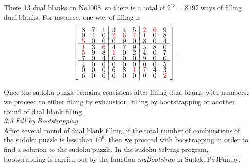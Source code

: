 \documentclass{article}[12pt,a4paper]
\begin{document}
There 13 dual blanks on No1008, so there is a total of $2^{13} = 8192$ ways of filling dual blanks. For instance, one way of filling is\\
\[ \left [ \begin{array}{ccc|ccc|ccc}
8 & 7 & 1 & 3 & 4 & 5 & \color{red} 2 & \color{red} 6 & 9 \\[-0.05in]
0 & 4 & 0 & \color{red} 2 & \color{red} 6 & \color{red} 7 & 1 & 0 & 8 \\[-0.05in]
\color{red} 5 & 0 & 0 & 0 & 9 & 0 & 3 & 0 & 4 \\[-0.05in] \hline
\color{red} 1 & 3 & \color{red} 6 & 4 & 7 & 9 & 5 & 8 & 0 \\[-0.05in]
\color{red} 5 & 9 & 8 & \color{red} 1 & 0 & 2 & 4 & 0 & 7 \\[-0.05in]
7 & 0 & 4 & 0 & 0 & 0 & 9 & 0 & 0 \\[-0.05in] \hline
4 & 0 & 0 & 0 & 0 & 0 & 0 & 0 & 5 \\[-0.05in]
0 & 0 & 0 & 6 & 8 & \color{red} 1 & \color{red} 7 & 4 & 3 \\[-0.05in]
6 & 0 & 0 & 0 & 0 & 0 & 0 & 0 & \color{red} 2 
\end{array} \right] \, .\]
\vspace*{4pt}

Once the sudoku puzzle remains consistent after filling dual blanks with numbers, 
we proceed to either filling by exhaustion, filling by bootstrapping or another round of dual blank filling. \\
\newpage
{\it 3.3 Fill by Bootstrapping} \\[4pt]

After several round of dual blank filling, if the total number of combinations of the sudoku puzzle is less than $10^6$, 
then we procced with boostrapping in order to find a solution to the sudoku puzzle. In the sudoku solving program, 
bootstrapping is carried out by the function {\it myBootstrap} in SudokuPy3Fun.py. \\
\end{document}
